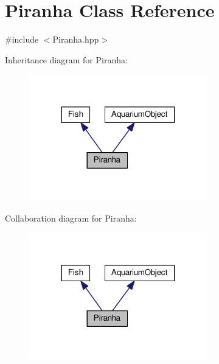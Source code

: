\hypertarget{class_piranha}{}\section{Piranha Class Reference}
\label{class_piranha}


{\ttfamily \#include $<$Piranha.\+hpp$>$}



Inheritance diagram for Piranha\+:
\nopagebreak
\begin{figure}[H]
\begin{center}
\leavevmode
\includegraphics[width=220pt]{class_piranha__inherit__graph}
\end{center}
\end{figure}


Collaboration diagram for Piranha\+:
\nopagebreak
\begin{figure}[H]
\begin{center}
\leavevmode
\includegraphics[width=220pt]{class_piranha__coll__graph}
\end{center}
\end{figure}
